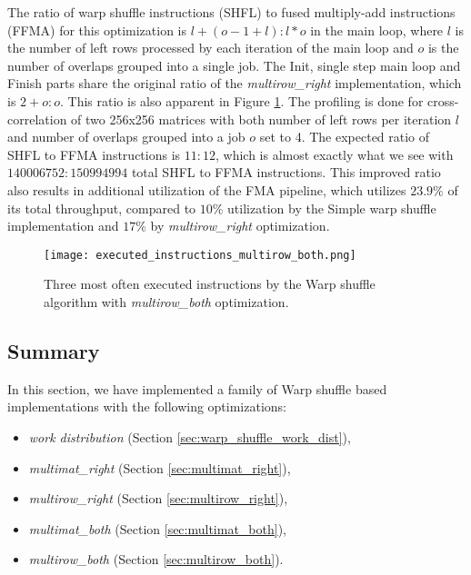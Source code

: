 The ratio of warp shuffle instructions (SHFL) to fused multiply-add instructions (FFMA) for this optimization is $l + (o - 1 + l) : l * o$ in the main loop, where $l$ is the number of left rows processed by each iteration of the main loop and $o$ is the number of overlaps grouped into a single job.  
The Init, single step main loop and Finish parts share the original ratio of the \textit{multirow\_right} implementation, which is $2 + o : o$. This ratio is also apparent in Figure \ref{fig:multirow_both_executed_instructions}. The profiling is done for cross-correlation of two 256x256 matrices with both number of left rows per iteration $l$ and number of overlaps grouped into a job $o$ set to 4. The expected ratio of SHFL to FFMA instructions is $11:12$, which is almost exactly what we see with $140 006 752 : 150 994 994$ total SHFL to FFMA instructions. This improved ratio also results in additional utilization of the FMA pipeline, which utilizes $23.9\%$ of its total throughput, compared to $10\%$ utilization by the Simple warp shuffle implementation and $17\%$ by \textit{multirow\_right} optimization.

\begin{figure}
	\centering
	\texttt{[image: executed\_instructions\_multirow\_both.png]}
	\caption{Three most often executed instructions by the Warp shuffle algorithm with \textit{multirow\_both} optimization.}
	\label{fig:multirow_both_executed_instructions}
\end{figure}


\subsection{Summary}
\label{sec:combining_optimizations}

In this section, we have implemented a family of Warp shuffle based implementations with the following optimizations:
\begin{itemize}
	\item \textit{work distribution} (Section \ref{sec:warp_shuffle_work_dist}),
	\item \textit{multimat\_right} (Section \ref{sec:multimat_right}),
	\item \textit{multirow\_right} (Section \ref{sec:multirow_right}),
	\item \textit{multimat\_both} (Section \ref{sec:multimat_both}),
	\item \textit{multirow\_both} (Section \ref{sec:multirow_both}).
\end{itemize}

